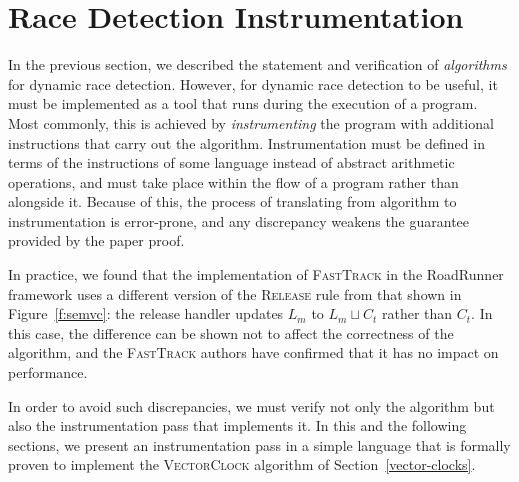 \documentclass[preprint, 10pt]{sigplanconf}
\newcommand{\VCalg}{\textsc{VectorClock}\xspace}
\newcommand{\FT}{\textsc{FastTrack}\xspace}
\newcommand{\Rule}[1]{\textsc{#1}}
\begin{document}
\section{Race Detection Instrumentation}
\label{language}

In the previous section, we described the statement and verification of \emph{algorithms} for dynamic race detection. However, for dynamic race detection to be useful, it must be implemented as a tool that runs during the execution of a program. Most commonly, this is achieved by \emph{instrumenting} the program with additional instructions that carry out the algorithm. Instrumentation must be defined in terms of the instructions of some language instead of abstract arithmetic operations, and must take place within the flow of a program rather than alongside it. Because of this, the process of translating from algorithm to instrumentation is error-prone, and any discrepancy weakens the guarantee provided by the paper proof.

In practice, we found that the implementation of \FT in the RoadRunner framework uses a different version of the \Rule{Release} rule from that shown in Figure~\ref{f:semvc}: the release handler updates $L_m$ to $L_m \sqcup C_t$ rather than $C_t$. In this case, the difference can be shown not to affect the correctness of the algorithm, and the \FT authors have confirmed that it has no impact on performance. 

In order to avoid such discrepancies, we must verify not only the algorithm but also the instrumentation pass that implements it. In this and the following sections, we present an instrumentation pass in a simple language that is formally proven to implement the \VCalg algorithm of Section~\ref{vector-clocks}.
\end{document}
